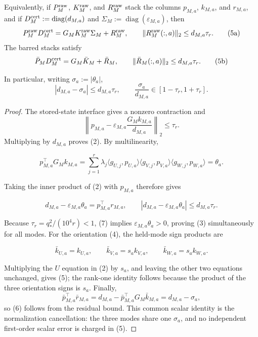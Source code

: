 \begin{lemma}
Equivalently, if \(P_M^{\rm raw}\), \(K_M^{\rm raw}\), and \(R_M^{\rm raw}\)
stack the columns \(p_{M,a}\), \(k_{M,a}\), and \(r_{M,a}\), and if
\(D_M^{\rm cert}:=\operatorname{diag}(d_{M,a})\) and
\(\Sigma_M:=\operatorname{diag}(\varepsilon_{M,a})\), then
\[
P_M^{\rm raw}D_M^{\rm cert}
=G_MK_M^{\rm raw}\Sigma_M+R_M^{\rm raw},\qquad
\|R_M^{\rm raw}(:,a)\|_2\le d_{M,a}\tau_r.
\tag{5a}
\]
The barred stacks satisfy
\[
\bar P_MD_M^{\rm cert}=G_M\bar K_M+\bar R_M,\qquad
\|\bar R_M(:,a)\|_2\le d_{M,a}\tau_r.
\tag{5b}
\]

In particular, writing $\sigma_a:=|\theta_a|$,
\[
|d_{M,a}-\sigma_a|\le d_{M,a}\tau_r,
\qquad
\frac{\sigma_a}{d_{M,a}}\in[1-\tau_r,1+\tau_r].
\tag{6}
\]

\begin{proof}
The stored-state interface gives a nonzero
contraction and
\[
\left\|p_{M,a}-\varepsilon_{M,a}
\frac{G_Mk_{M,a}}{d_{M,a}}\right\|_2\le\tau_r.
\]
Multiplying by $d_{M,a}$ proves (2).  By multilinearity,

\[
p_{M,a}^{\top}G_Mk_{M,a}
=\sum_{j=1}^r\lambda_j
\langle g_{U,j},p_{U,a}\rangle
\langle g_{V,j},p_{V,a}\rangle
\langle g_{W,j},p_{W,a}\rangle
=\theta_a.
\]

Taking the inner product of (2) with $p_{M,a}$ therefore gives

\[
d_{M,a}-\varepsilon_{M,a}\theta_a
=p_{M,a}^{\top}r_{M,a},
\qquad
|d_{M,a}-\varepsilon_{M,a}\theta_a|\le d_{M,a}\tau_r.
\tag{7}
\]

Because $\tau_r=q_*^2/(10^4r)<1$, (7) implies
$\varepsilon_{M,a}\theta_a>0$, proving (3) simultaneously for all modes.
For the orientation (4), the held-mode sign products are

\[
\bar k_{U,a}=k_{U,a},\qquad
\bar k_{V,a}=s_ak_{V,a},\qquad
\bar k_{W,a}=s_ak_{W,a}.
\]

Multiplying the $U$ equation in (2) by $s_a$, and leaving the other two
equations unchanged, gives (5); the rank-one identity follows because the
product of the three orientation signs is $s_a$.  Finally,
\[
\bar p_{M,a}^{\top}\bar r_{M,a}
=d_{M,a}-\bar p_{M,a}^{\top}G_M\bar k_{M,a}
=d_{M,a}-\sigma_a,
\]
so (6) follows from the residual bound.  This common scalar identity is the
normalization cancellation: the three modes share one $\sigma_a$, and no
independent first-order scalar error is charged in (5).  


\end{proof}
\end{lemma}
